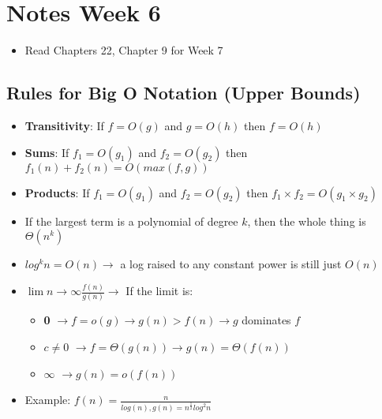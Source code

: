 \documentclass[12pt]{article}
\begin{document}
\section*{Notes Week 6}

\begin{itemize}

    \item Read Chapters 22, Chapter 9 for Week 7

\end{itemize}


\subsection*{Rules for Big O Notation (Upper Bounds)}

\begin{itemize}

    \item \textbf{Transitivity}: If $f = O(g)$ and $g = O(h)$ then $f = O(h)$

    \item \textbf{Sums}: If $f_1 = O(g_1)$ and $f_2 = O(g_2)$ then $f_1(n) + f_2(n) = O( max(f, g) )$
    
    \item \textbf{Products}: If $f_1 = O(g_1)$ and $f_2 = O(g_2)$ then $f_1 \times f_2 = O(g_1 \times g_2)$

    \item If the largest term is a polynomial of degree $k$, then the whole thing is $\Theta(n^k)$

    \item $log^kn = O(n) \rightarrow$ a log raised to any constant power is still just $O(n)$

    \item $\lim{n\to\infty} \frac{f(n)}{g(n)} \rightarrow$ If the limit is:
    \begin{itemize}
        \item \textbf{0} $\rightarrow f=o(g) \rightarrow g(n) > f(n) \rightarrow g$ dominates $f$
        \item \textbf{$c \neq 0$} $\rightarrow f = \Theta(g(n)) \rightarrow g(n) = \Theta(f(n))$
        \item \textbf{$\infty$} $\rightarrow g(n) = o(f(n))$
    \end{itemize}

    \item Example: $f(n) = \frac{n}{log(n), g(n) = n^{\frac{1}{2}}log^2n}$

\end{itemize}
\end{document}
